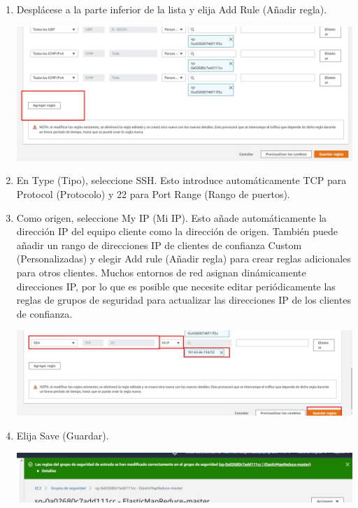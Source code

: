 \documentclass[12pt,letterpaper]{article}
\begin{document}
\begin{enumerate}
\begin{enumerate}
		\item Desplácese a la parte inferior de la lista y elija Add Rule (Añadir regla). 
		\begin{center}
			\includegraphics[width=14cm]{./img/3.8.jpg} 
		\end{center}
		\item En Type (Tipo), seleccione SSH. Esto introduce automáticamente TCP para Protocol (Protocolo) y 22
		para Port Range (Rango de puertos). 
		\item Como origen, seleccione My IP (Mi IP). Esto añade automáticamente la dirección IP del equipo cliente
		como la dirección de origen. También puede añadir un rango de direcciones IP de clientes de confianza
		Custom (Personalizadas) y elegir Add rule (Añadir regla) para crear reglas adicionales para otros
		clientes. Muchos entornos de red asignan dinámicamente direcciones IP, por lo que es posible que 
		necesite editar periódicamente las reglas de grupos de seguridad para actualizar las direcciones IP de
		los clientes de confianza. 
		\begin{center}
			\includegraphics[width=14cm]{./img/3.10.jpg} 
		\end{center}
		\item Elija Save (Guardar).
		\begin{center}
			\includegraphics[width=14cm]{./img/3.11.jpg} 
		\end{center}


\end{enumerate}
\end{enumerate}
\end{document}
